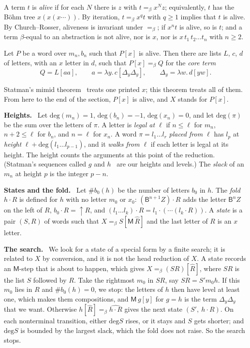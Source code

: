 \documentclass[a4paper,english]{lipics-v2021}
\newcommand{\B}{\mathsf{B}}
\newcommand{\M}{\mathsf{M}}
\newcommand{\eqb}{=_{\beta}}
\newcommand{\Del}[1]{\Delta_{#1}}
\newcommand{\hatw}[1]{\widehat{#1}}
\newcommand{\up}{{\uparrow}}
\newcommand{\dg}{\mathrm{deg}}
\newcommand{\nb}[1]{\#b_0(#1)}
\newcommand{\runin}[1]{\par\smallskip\noindent\textbf{#1}\ }
\begin{document}
A term $t$ is \emph{alive} if for each $N$ there is $z$ with $t \eqb x^Nz$; equivalently, $t$ has the Böhm tree $x(x(x\cdots))$. By iteration, $t \eqb x^qt$ with $q \geq 1$ implies that $t$ is alive. By Church--Rosser, aliveness is invariant under $\eqb$; if $x^nt$ is alive, so is $t$; and a term $\beta$-equal to an abstraction is not alive, nor is $x$, nor is $x\,t_1\,t_2\ldots t_n$ with $n \geq 2$.

\begin{theorem}[Shape]\label{thm:shape}
Let $P$ be a word over $m_n,b_n$ such that $P[x]$ is alive. Then there are lists $L$, $c$, $d$ of letters, with an $x$ letter in $d$, such that $P[x] \eqb Q$ for the \emph{core term}
\[
Q = L[aa], \qquad a = \lambda y.\,c[\Del{y}\Del{y}], \qquad \Del{y} = \lambda w.\,d[yw].
\]
\end{theorem}

Statman's mimid theorem~\cite[Theorem~6.2.1]{statman2017} treats one printed $x$; this theorem treats all of them. From here to the end of the section, $P[x]$ is alive, and $X$ stands for $P[x]$.

\runin{Heights.} Let $\dg(m_n) = 1$, $\dg(b_n) = -1$, $\dg(x_n) = 0$, and let $\dg(\pi)$ be the sum over the letters of $\pi$. A letter is \emph{legal at $\ell$} if $n \leq \ell$ for $m_n$, $n+2 \leq \ell$ for $b_n$, and $n = \ell$ for $x_n$. A word $\pi = l_1\ldots l_r$ \emph{placed from $\ell$} has $l_p$ at \emph{height} $\ell + \dg(l_1\ldots l_{p-1})$, and it \emph{walks from $\ell$} if each letter is legal at its height. The height counts the arguments at this point of the reduction. (Statman's sequences called $g$ and $h$~\cite[p.~118]{statman2017} are our heights and levels.) The \emph{slack} of an $m_n$ at height $p$ is the integer $p - n$.

\runin{States and the fold.} Let $\nb{h}$ be the number of letters $b_0$ in $h$. The \emph{fold} $h\cdot R$ is defined for $h$ with no letter $m_0$ or $x_0$: $(\B^{n+1}Z)\cdot R$ adds the letter $\B^nZ$ on the left of $R$, $b_0\cdot R = \up R$, and $(l_1\ldots l_k)\cdot R = l_1\cdot(\cdots(l_k\cdot R))$. A \emph{state} is a pair $(S,R)$ of words such that $X \eqb S[\M\,\hatw{R}]$ and the last letter of $R$ is an $x$ letter.

\runin{The search.} We look for a state of a special form by a finite search; it is related to $X$ by conversion, and it is not the head reduction of $X$. A state records an $\M$-step that is about to happen, which gives $X \eqb (SR)[\hatw{R}]$, where $SR$ is the list $S$ followed by $R$. Take the rightmost $m_0$ in $SR$, say $SR = S'm_0h$. If this $m_0$ lies in $R$ and $\nb{h} = 0$, we stop: the letters of $h$ then have level at least one, which makes them compositions, and $\M\,g[y]$ for $g = h$ is the term $\Del{y}\Del{y}$ that we want. Otherwise $h[\hatw{R}] \eqb \widehat{h\cdot R}$ gives the next state $(S',\ h\cdot R)$. On each nonterminal transition, either $\dg S$ rises, or it stays and $S$ gets shorter; and $\dg S$ is bounded by the largest slack, which the fold does not raise. So the search stops.
\end{document}
